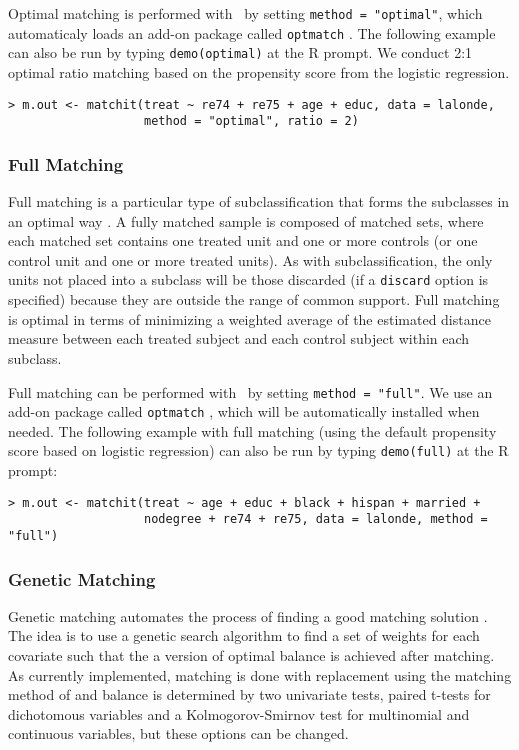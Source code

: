 Optimal matching is performed with \MatchIt\ by setting \texttt{method
  = "optimal"}, which automaticaly loads an add-on package called
\texttt{optmatch} \citep{Hansen04}.  The following example can also be
run by typing {\tt demo(optimal)} at the R prompt.  We conduct 2:1 optimal
ratio matching based on the propensity score from the logistic
regression.
\begin{verbatim}
> m.out <- matchit(treat ~ re74 + re75 + age + educ, data = lalonde, 
                   method = "optimal", ratio = 2)
\end{verbatim}

\subsubsection{Full Matching}
\label{subsubsec:full}

Full matching is a particular type of subclassification that forms
the subclasses in an optimal way \citep{Rosenbaum02, Hansen04}.  A fully
matched sample is composed of matched sets, where each matched set
contains one treated unit and one or more controls (or one control
unit and one or more treated units).  As with subclassification, the only units not placed into a
subclass will be those discarded (if a \texttt{discard} option is
specified) because they are outside the range of common support.  Full
matching is optimal in terms of minimizing a weighted average of the
estimated distance measure between each treated subject and each
control subject within each subclass.

Full matching can be performed with \MatchIt\ by setting
\texttt{method = "full"}.  We use an add-on package called
\texttt{optmatch} \citep{Hansen04}, which will be automatically
installed when needed.  The following example with full matching
(using the default propensity score based on logistic regression) can
also be run by typing {\tt demo(full)} at the R prompt:
\begin{verbatim}
> m.out <- matchit(treat ~ age + educ + black + hispan + married +
                   nodegree + re74 + re75, data = lalonde, method = "full")
\end{verbatim}

\subsubsection{Genetic Matching}
\label{subsub:genetic}

Genetic matching automates the process of finding a good matching
solution \citep{DiaSek05}.  The idea is to use a genetic search
algorithm to find a set of weights for each covariate such that the a
version of optimal balance is achieved after matching.  As currently
implemented, matching is done with replacement using the matching
method of \citet{AbaImb04} and balance is determined by two univariate
tests, paired t-tests for dichotomous variables and a
Kolmogorov-Smirnov test for multinomial and continuous variables, but
these options can be changed.

